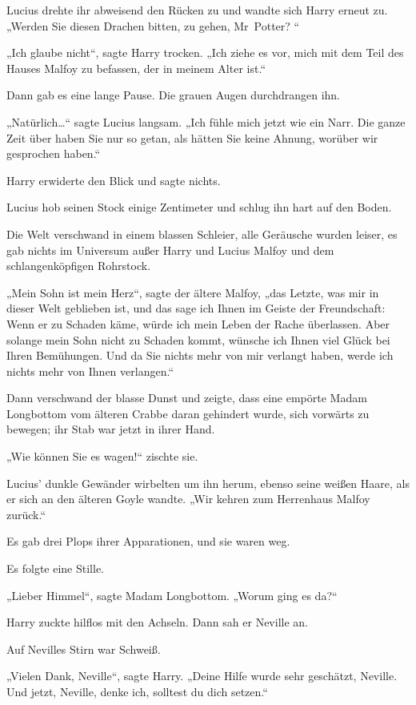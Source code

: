 {Lucius drehte ihr abweisend den Rücken zu und wandte sich Harry erneut zu. „Werden Sie diesen Drachen bitten, zu gehen, Mr~Potter? “

„Ich glaube nicht“, sagte Harry trocken. „Ich ziehe es vor, mich mit dem Teil des Hauses Malfoy zu befassen, der in meinem Alter ist.“

Dann gab es eine lange Pause. Die grauen Augen durchdrangen ihn.

„Natürlich…“ sagte Lucius langsam. „Ich fühle mich jetzt wie ein Narr. Die ganze Zeit über haben Sie nur so getan, als hätten Sie keine Ahnung, worüber wir gesprochen haben.“

Harry erwiderte den Blick und sagte nichts.

Lucius hob seinen Stock einige Zentimeter und schlug ihn hart auf den Boden.

Die Welt verschwand in einem blassen Schleier, alle Geräusche wurden leiser, es gab nichts im Universum außer Harry und Lucius Malfoy und dem schlangenköpfigen Rohrstock.

„Mein Sohn ist mein Herz“, sagte der ältere Malfoy, „das Letzte, was mir in dieser Welt geblieben ist, und das sage ich Ihnen im Geiste der Freundschaft: Wenn er zu Schaden käme, würde ich mein Leben der Rache überlassen. Aber solange mein Sohn nicht zu Schaden kommt, wünsche ich Ihnen viel Glück bei Ihren Bemühungen. Und da Sie nichts mehr von mir verlangt haben, werde ich nichts mehr von Ihnen verlangen.“

Dann verschwand der blasse Dunst und zeigte, dass eine empörte Madam Longbottom vom älteren Crabbe daran gehindert wurde, sich vorwärts zu bewegen; ihr Stab war jetzt in ihrer Hand.

„Wie können Sie es wagen!“ zischte sie.

Lucius' dunkle Gewänder wirbelten um ihn herum, ebenso seine weißen Haare, als er sich an den älteren Goyle wandte. „Wir kehren zum Herrenhaus Malfoy zurück.“

Es gab drei Plops ihrer Apparationen, und sie waren weg.

Es folgte eine Stille.

„Lieber Himmel“, sagte Madam Longbottom. „Worum ging es da?“

Harry zuckte hilflos mit den Achseln. Dann sah er Neville an.

Auf Nevilles Stirn war Schweiß.

„Vielen Dank, Neville“, sagte Harry. „Deine Hilfe wurde sehr geschätzt, Neville. Und jetzt, Neville, denke ich, solltest du dich setzen.“

}
